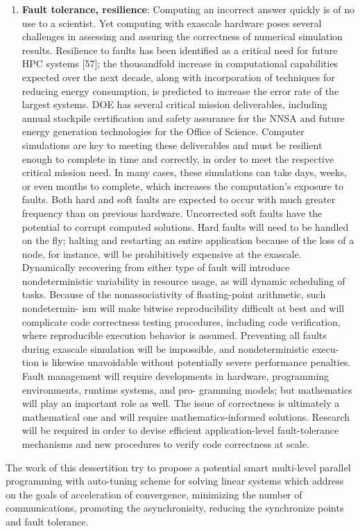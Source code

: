 \begin{enumerate}
	\item \textbf{Fault tolerance, resilience}: Computing an incorrect answer quickly is of no use to a scientist. Yet computing with exascale hardware poses several challenges in assessing and assuring the correctness of numerical simulation results. Resilience to faults has been identified as a critical need for future HPC systems [57]; the thousandfold increase in computational capabilities expected over the next decade, along with incorporation of techniques for reducing energy consumption, is predicted to increase the error rate of the largest systems. DOE has several critical mission deliverables, including annual stockpile certification and safety assurance for the NNSA and future energy generation technologies for the Office of Science. Computer simulations are key to meeting these deliverables and must be resilient enough to complete in time and correctly, in order to meet the respective critical mission need. In many cases, these simulations can take days, weeks, or even months to complete, which increases the computation’s exposure to faults. Both hard and soft faults are expected to occur with much greater frequency than on previous hardware. Uncorrected soft faults have the potential to corrupt computed solutions. Hard faults will need to be handled on the fly; halting and restarting an entire application because of the loss of a node, for instance, will be prohibitively expensive at the exascale. Dynamically recovering from either type of fault will introduce nondeterministic variability in resource usage, as will dynamic scheduling of tasks. Because of the nonassociativity of floating-point arithmetic, such nondetermin- ism will make bitwise reproducibility difficult at best and will complicate code correctness testing procedures, including code verification, where reproducible execution behavior is assumed. Preventing all faults during exascale simulation will be impossible, and nondeterministic execu- tion is likewise unavoidable without potentially severe performance penalties. Fault management will require developments in hardware, programming environments, runtime systems, and pro- gramming models; but mathematics will play an important role as well. The issue of correctness is ultimately a mathematical one and will require mathematics-informed solutions. Research will be required in order to devise efficient application-level fault-tolerance mechanisms and new procedures to verify code correctness at scale.

\end{enumerate}

The work of this dessertition try to propose a potential smart multi-level parallel programming with auto-tuning scheme for solving linear systems which address on the goals of acceleration of convergence, minimizing the number of communications, promoting the asynchronisity, reducing the synchronize points and fault tolerance.

\clearemptydoublepage